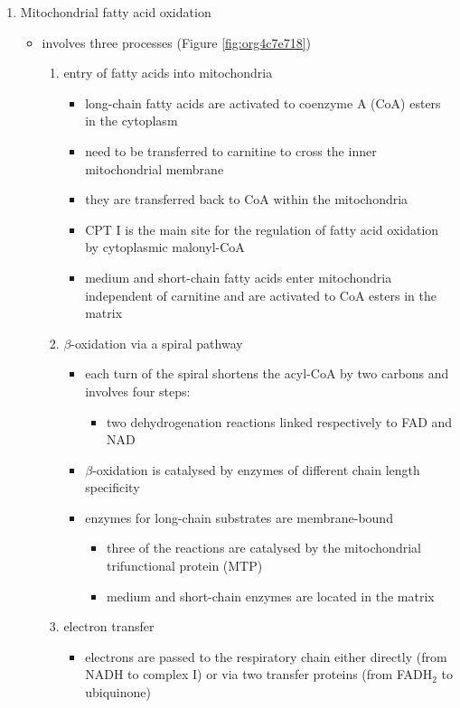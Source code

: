 \documentclass{scrartcl}
\begin{document}
\begin{enumerate}
\item Mitochondrial fatty acid oxidation
\label{sec:org43c3ac3}

\begin{itemize}
\item involves three processes (Figure \ref{fig:org4c7e718})
\begin{enumerate}
\item entry of fatty acids into mitochondria
\begin{itemize}
\item long-chain fatty acids are activated to coenzyme A (CoA) esters
in the cytoplasm
\item need to be transferred to carnitine to cross the inner
mitochondrial membrane
\item they are transferred back to CoA within the mitochondria
\item CPT I is the main site for the regulation of fatty acid
oxidation by cytoplasmic malonyl-CoA
\item medium and short-chain fatty acids enter mitochondria
independent of carnitine and are activated to CoA esters in the
matrix
\end{itemize}
\item \(\beta\)-oxidation via a spiral pathway
\begin{itemize}
\item each turn of the spiral shortens the acyl-CoA by two carbons and involves four steps:
\begin{itemize}
\item two dehydrogenation reactions linked respectively to FAD and NAD
\end{itemize}
\item \(\beta\)-oxidation is catalysed by enzymes of different chain
length specificity
\item enzymes for long-chain substrates are membrane-bound
\begin{itemize}
\item three of the reactions are catalysed by the mitochondrial
trifunctional protein (MTP)
\item medium and short-chain enzymes are located in the matrix
\end{itemize}
\end{itemize}
\item electron transfer
\begin{itemize}
\item electrons are passed to the respiratory chain either directly
(from NADH to complex I) or via two transfer proteins (from
FADH\(_{\text{2}}\) to ubiquinone)
\end{itemize}
\end{enumerate}
\end{itemize}


\end{enumerate}
\end{document}
